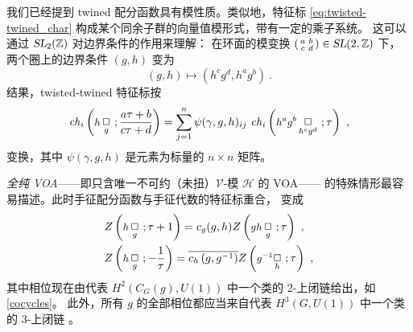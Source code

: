 我们已经提到 twined 配分函数具有模性质。类似地，特征标 \eqref{eq:twisted-twined_char}
构成某个同余子群的向量值模形式，带有一定的乘子系统。
这可以通过 $\operatorname{\textsl{SL}}_2(\mathbb{Z})$ 对边界条件的作用来理解：
在环面的模变换 $(\begin{smallmatrix} a& b \\c&d\end{smallmatrix})\in\operatorname{\textsl{SL}}(2,\mathbb{Z})$ 下，
两个圈上的边界条件 $(g,h)$ 变为
\begin{equation}
\label{eq:orb_b.c.}
(g,h)\mapsto\left(h^cg^d,h^ag^b\right)~.
\end{equation}
结果，twisted-twined 特征标按
\begin{equation}
\label{eq:tw_tw_char}
{\it ch}_i\left(\mbox{\fontsize{9}{10}\selectfont $h\,$}\underset{g}{\Box}~;\frac{a\tau+b}{c\tau+d}\right) =\sum_{j=1}^n\psi(\gamma,g,h)_{ij}~ {\it ch}_i\left(\mbox{\fontsize{9}{10}\selectfont $h^ag^b\,$}\underset{h^cg^d}{\Box}~;\t\right)~,
\end{equation}
变换，其中 $\psi(\gamma,g,h)$ 是元素为标量的 $n\times n$ 矩阵。


\emph{全纯 VOA}——即只含唯一不可约（未扭）$\mathcal{V}$-模 $\mathcal{H}$ 的 VOA——
的特殊情形最容易描述。此时手征配分函数与手征代数的特征标重合，
 变成 \cite{BantayP.1990OaHa}
\begin{equation}\label{eqn:modular_boundary_condition}
\begin{split}
&Z\left(\mbox{\fontsize{9}{10}\selectfont $h\,$}\underset{g}{\Box}~;\t+1\right)=c_g(g,h)Z\left(\mbox{\fontsize{9}{10}\selectfont $gh\,$}\underset{g}{\Box}~;\t\right)~, \\
&Z\left(\mbox{\fontsize{9}{10}\selectfont $h\,$}\underset{g}{\Box}~;-{1\over\t}\right)=\overline{c_h\left(g,g^{-1}\right)}Z\left(\mbox{\fontsize{9}{10}\selectfont $g^{-1}$}\underset{h}{\Box}~;\t\right)~,
\end{split}
\end{equation}
其中相位现在由代表 $H^2(C_G(g),U(1))$ 中一个类的 2-上闭链给出，如 \eqref{cocycles}。
此外，所有 $g$ 的全部相位都应当来自代表 $H^3(G,U(1))$ 中一个类的 3-上闭链
\cite{Roche:1990hs,BantayP.1990OaHa}。


